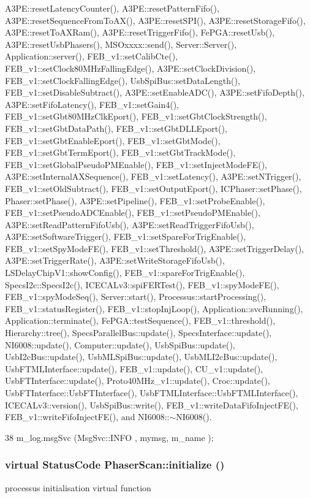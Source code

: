 A3PE::resetLatencyCounter(), A3PE::resetPatternFifo(), A3PE::resetSequenceFromToAX(), A3PE::resetSPI(), A3PE::resetStorageFifo(), A3PE::resetToAXRam(), A3PE::resetTriggerFifo(), FePGA::resetUsb(), A3PE::resetUsbPhasers(), MSOxxxx::send(), Server::Server(), Application::server(), FEB\_\-v1::setCalibCte(), FEB\_\-v1::setClock80MHzFallingEdge(), A3PE::setClockDivision(), FEB\_\-v1::setClockFallingEdge(), UsbSpiBus::setDataLength(), FEB\_\-v1::setDisableSubtract(), A3PE::setEnableADC(), A3PE::setFifoDepth(), A3PE::setFifoLatency(), FEB\_\-v1::setGain4(), FEB\_\-v1::setGbt80MHzClkEport(), FEB\_\-v1::setGbtClockStrength(), FEB\_\-v1::setGbtDataPath(), FEB\_\-v1::setGbtDLLEport(), FEB\_\-v1::setGbtEnableEport(), FEB\_\-v1::setGbtMode(), FEB\_\-v1::setGbtTermEport(), FEB\_\-v1::setGbtTrackMode(), FEB\_\-v1::setGlobalPseudoPMEnable(), FEB\_\-v1::setInjectModeFE(), A3PE::setInternalAXSequence(), FEB\_\-v1::setLatency(), A3PE::setNTrigger(), FEB\_\-v1::setOldSubtract(), FEB\_\-v1::setOutputEport(), ICPhaser::setPhase(), Phaser::setPhase(), A3PE::setPipeline(), FEB\_\-v1::setProbeEnable(), FEB\_\-v1::setPseudoADCEnable(), FEB\_\-v1::setPseudoPMEnable(), A3PE::setReadPatternFifoUsb(), A3PE::setReadTriggerFifoUsb(), A3PE::setSoftwareTrigger(), FEB\_\-v1::setSpareForTrigEnable(), FEB\_\-v1::setSpyModeFE(), FEB\_\-v1::setThreshold(), A3PE::setTriggerDelay(), A3PE::setTriggerRate(), A3PE::setWriteStorageFifoUsb(), LSDelayChipV1::showConfig(), FEB\_\-v1::spareForTrigEnable(), SpecsI2c::SpecsI2c(), ICECALv3::spiFERTest(), FEB\_\-v1::spyModeFE(), FEB\_\-v1::spyModeSeq(), Server::start(), Processus::startProcessing(), FEB\_\-v1::statusRegister(), FEB\_\-v1::stopInjLoop(), Application::svcRunning(), Application::terminate(), FePGA::testSequence(), FEB\_\-v1::threshold(), Hierarchy::tree(), SpecsParallelBus::update(), SpecsInterface::update(), NI6008::update(), Computer::update(), UsbSpiBus::update(), UsbI2cBus::update(), UsbMLSpiBus::update(), UsbMLI2cBus::update(), UsbFTMLInterface::update(), FEB\_\-v1::update(), CU\_\-v1::update(), UsbFTInterface::update(), Proto40MHz\_\-v1::update(), Croc::update(), UsbFTInterface::UsbFTInterface(), UsbFTMLInterface::UsbFTMLInterface(), ICECALv3::version(), UsbSpiBus::write(), FEB\_\-v1::writeDataFifoInjectFE(), FEB\_\-v1::writeFifoInjectFE(), and NI6008::$\sim$NI6008().


\begin{DoxyCode}
38 { m_log.msgSvc (MsgSvc::INFO    , mymsg, m_name ); }
\end{DoxyCode}
\hypertarget{classPhaserScan_aeb0dccb02754b11c19719962f7c43fb8}{
\subsubsection[{initialize}]{\setlength{\rightskip}{0pt plus 5cm}virtual {\bf StatusCode} PhaserScan::initialize ()}}
\label{classPhaserScan_aeb0dccb02754b11c19719962f7c43fb8}
processus initialisation virtual function 

